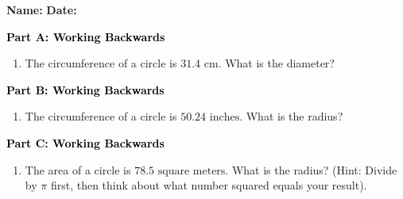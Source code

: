 \documentclass[12pt, letterpaper, fleqn]{article}
\begin{document}
\textbf{Name:} \underline{\hspace{5cm}}
\hfill
\textbf{Date:} \underline{\hspace{3cm}}\\

\begin{tcolorbox}[colback=customteal!20]
\large\textcolor{black}{\textbf{Part A: Working Backwards}}
\end{tcolorbox}

\vspace{3mm}

\begin{enumerate}[itemsep=2.5cm, leftmargin=0.6cm]
\item The circumference of a circle is $31.4\text{ cm}$. What is the diameter?
\end{enumerate}

\newpage

\begin{tcolorbox}[colback=customteal!20]
\large\textcolor{black}{\textbf{Part B: Working Backwards}}
\end{tcolorbox}

\vspace{3mm}

\begin{enumerate}[itemsep=2.5cm, leftmargin=0.6cm, resume]
\item The circumference of a circle is $50.24\text{ inches}$. What is the radius?
\end{enumerate}

\newpage

\begin{tcolorbox}[colback=customteal!20]
\large\textcolor{black}{\textbf{Part C: Working Backwards}}
\end{tcolorbox}

\vspace{3mm}

\begin{enumerate}[itemsep=2.5cm, leftmargin=0.6cm, resume]
\item The area of a circle is $78.5\text{ square meters}$. What is the radius? (Hint: Divide by $\pi$ first, then think about what number squared equals your result).
\end{enumerate}

\newpage
\end{document}
